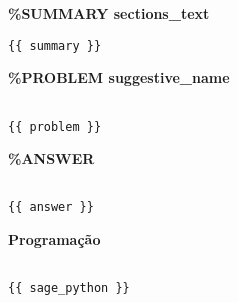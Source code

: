 

\noindent\textbf{\%SUMMARY {{ sections_text }} }

\begin{verbatim}
{{ summary }}
\end{verbatim}

\noindent\textbf{\%PROBLEM {{ suggestive_name }} }

\begin{verbatim}

{{ problem }}

\end{verbatim}

\noindent\textbf{\%ANSWER}

\begin{verbatim}

{{ answer }}

\end{verbatim}


\noindent\textbf{Programação}

\begin{verbatim}

{{ sage_python }}

\end{verbatim}



